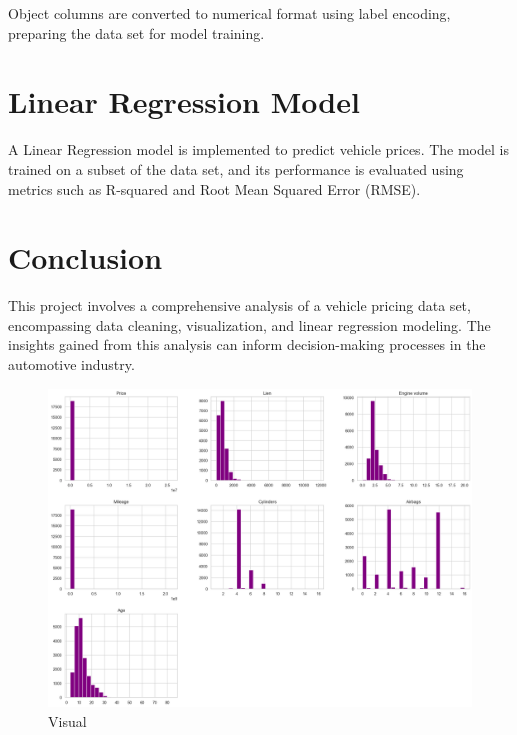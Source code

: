 \documentclass[paper=a4, fontsize=11pt,twoside]{scrartcl}
\begin{document}
Object columns are converted to numerical format using label encoding, preparing the data set for model training.

\section{Linear Regression Model}

A Linear Regression model is implemented to predict vehicle prices. The model is trained on a subset of the data set, and its performance is evaluated using metrics such as R-squared and Root Mean Squared Error (RMSE).

\section{Conclusion}

This project involves a comprehensive analysis of a vehicle pricing data set, encompassing data cleaning, visualization, and linear regression modeling. The insights gained from this analysis can inform decision-making processes in the automotive industry.


\begin{figure}[h!]
\includegraphics[width=\textwidth]{visual.png}
\caption{\label{fig:your-figure}Visual}
\end{figure}
\end{document}
